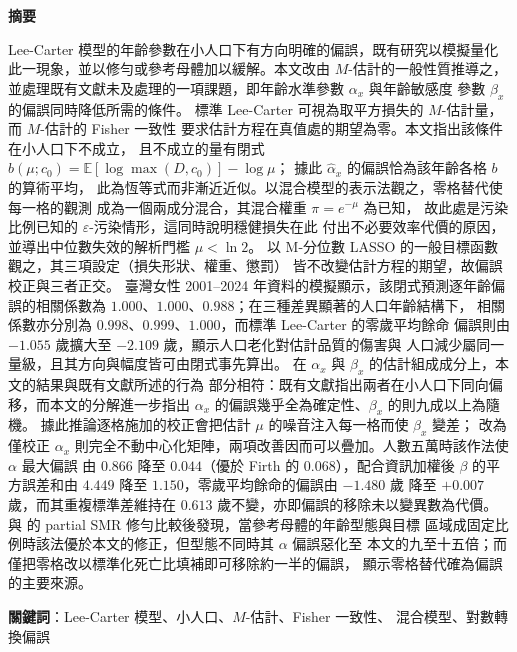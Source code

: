 \documentclass[UTF8, fontset=macnew, a4paper, 12pt]{ctexart}
\newcommand{\Ex}{\mathbb{E}}
\begin{document}
\begin{center}
\begin{minipage}{0.92\textwidth}
\small
\textbf{摘要}\par\vspace{4pt}
Lee-Carter 模型的年齡參數在小人口下有方向明確的偏誤，既有研究以模擬量化
此一現象，並以修勻或參考母體加以緩解。本文改由 $M$-估計的一般性質推導之，
並處理既有文獻未及處理的一項課題，即年齡水準參數 $\alpha_x$ 與年齡敏感度
參數 $\beta_x$ 的偏誤同時降低所需的條件。
標準 Lee-Carter 可視為取平方損失的 $M$-估計量，而 $M$-估計的 Fisher 一致性
要求估計方程在真值處的期望為零。本文指出該條件在小人口下不成立，
且不成立的量有閉式 $b(\mu;c_0)=\Ex[\log\max(D,c_0)]-\log\mu$；
據此 $\hat\alpha_x$ 的偏誤恰為該年齡各格 $b$ 的算術平均，
此為恆等式而非漸近近似。以混合模型的表示法觀之，零格替代使每一格的觀測
成為一個兩成分混合，其混合權重 $\pi=e^{-\mu}$ 為已知，
故此處是污染比例已知的 $\varepsilon$-污染情形，這同時說明穩健損失在此
付出不必要效率代價的原因，並導出中位數失效的解析門檻 $\mu<\ln 2$。
以 M-分位數 LASSO 的一般目標函數觀之，其三項設定（損失形狀、權重、懲罰）
皆不改變估計方程的期望，故偏誤校正與三者正交。
臺灣女性 2001--2024 年資料的模擬顯示，該閉式預測逐年齡偏誤的相關係數為
$1.000$、$1.000$、$0.988$；在三種差異顯著的人口年齡結構下，
相關係數亦分別為 $0.998$、$0.999$、$1.000$，而標準 Lee-Carter 的零歲平均餘命
偏誤則由 $-1.055$ 歲擴大至 $-2.109$ 歲，顯示人口老化對估計品質的傷害與
人口減少屬同一量級，且其方向與幅度皆可由閉式事先算出。
在 $\alpha_x$ 與 $\beta_x$ 的估計組成成分上，本文的結果與既有文獻所述的行為
部分相符：既有文獻指出兩者在小人口下同向偏移，而本文的分解進一步指出
$\alpha_x$ 的偏誤幾乎全為確定性、$\beta_x$ 的則九成以上為隨機。
據此推論逐格施加的校正會把估計 $\mu$ 的噪音注入每一格而使 $\beta_x$ 變差；
改為僅校正 $\alpha_x$ 則完全不動中心化矩陣，兩項改善因而可以疊加。人數五萬時該作法使 $\alpha$ 最大偏誤
由 $0.866$ 降至 $0.044$（優於 Firth 的 $0.068$），配合資訊加權後
$\beta$ 的平方誤差和由 $4.449$ 降至 $1.150$，零歲平均餘命的偏誤由 $-1.480$ 歲
降至 $+0.007$ 歲，而其重複標準差維持在 $0.613$ 歲不變，亦即偏誤的移除未以變異數為代價。
與 \citet{lee2003} 的 partial SMR 修勻比較後發現，當參考母體的年齡型態與目標
區域成固定比例時該法優於本文的修正，但型態不同時其 $\alpha$ 偏誤惡化至
本文的九至十五倍；而僅把零格改以標準化死亡比填補即可移除約一半的偏誤，
顯示零格替代確為偏誤的主要來源。
\par\vspace{6pt}
\textbf{關鍵詞}：Lee-Carter 模型、小人口、$M$-估計、Fisher 一致性、
混合模型、對數轉換偏誤
\end{minipage}
\end{center}
\end{document}

